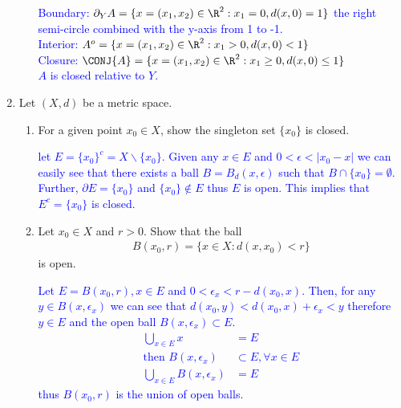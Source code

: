 \documentclass[10pt,a4paper]{report}
\newcommand{\BLUE}[1]{\textcolor{blue}{#1}}
\begin{document}
\begin{enumerate}[label=\Roman*.]
\begin{enumerate}[label=(\alph*)]
\BLUE{
Boundary: $\partial_Y A = \{x=(x_1,x_2) \in \R^2:  x_1=0, d(x,0) = 1\}$ the right semi-circle combined with the y-axis from 1 to -1.\\
Interior: $A^o = \{x=(x_1,x_2) \in \R^2: x_1 >0, d(x,0) < 1\}$\\
Closure: $\CONJ{A} = \{x=(x_1,x_2) \in \R^2: x_1 \ge 0, d(x,0) \le 1\}$ \\
$A$ is closed relative to $Y$.
}

\end{enumerate}

\item Let $(X,d)$ be a metric space.
\begin{enumerate}[label=(\alph*)]
\item For a given point $x_0 \in X$, show the singleton set $\{x_0\}$ is closed.

\BLUE{let $E = \{x_0\}^c= X \backslash \{ x_0\}$.  Given any $x \in E$ and $0< \epsilon < | x_0 -x|$ we can easily see that there exists a ball $B=B_d(x, \epsilon)$ such that $B \cap \{x_0\} = \emptyset$.  Further, $\partial E  = \{ x_0 \}$ and $\{x_0\}\not \in E$ thus $E$ is open.  This implies that $E^c=\{x_0\}$ is closed.
}

\item Let $x_0 \in X$ and $r > 0$.  Show that the ball 
\begin{align*}
	B(x_0,r) = \{x \in X: d(x,x_0) < r\}
\end{align*}is open.

\BLUE{Let $E = B(x_0,r), x \in E$ and $0<\epsilon_x < r-d(x_0,x)$.  Then, for any $y \in B(x, \epsilon_x)$ we can see that $d(x_0,y)< d(x_0,x)+\epsilon_x < y$ therefore $y \in E$ and the open ball $B(x,\epsilon_x) \subset E$.  \begin{align*}
	\bigcup_{x \in E} x &= E\\
	\text{then } B(x,\epsilon_x) &\subset E, \forall x \in E\\
	\bigcup_{x \in E} B(x, \epsilon_x) &= E
\end{align*}thus $B(x_0,r)$ is the union of open balls.
}
\end{enumerate}

\end{enumerate}
\end{document}
